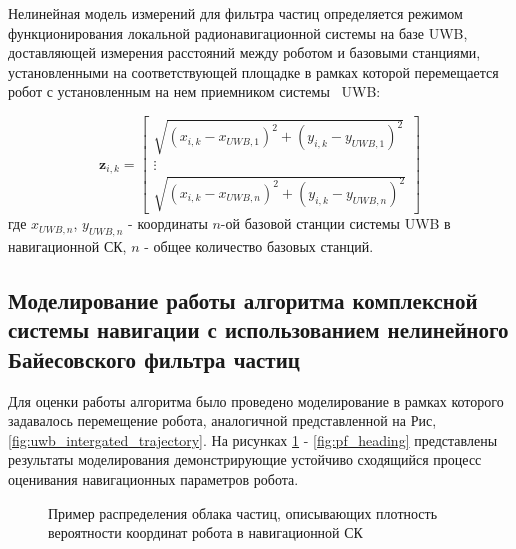 \documentclass[14pt]{article}
\begin{document}
Нелинейная модель измерений для фильтра частиц определяется режимом функционирования локальной радионавигационной системы на базе UWB, доставляющей измерения расстояний между роботом и  базовыми станциями, установленными на соответствующей площадке в рамках которой перемещается робот с установленным на нем приемником системы  UWB:

\begin{equation}
 \mathbf z_{i, k} = \begin{bmatrix} \sqrt{\left(x_{i, k} - x_{UWB, 1}\right)^2 + \left(y_{i, k} - y_{UWB, 1}\right)^2} \\ \vdots \\    \sqrt{\left(x_{i, k} - x_{UWB, n}\right)^2 + \left(y_{i, k} - y_{UWB,  n}\right)^2}  \end{bmatrix} 
\end{equation}
где $x_{UWB, n}$, $y_{UWB, n}$ - координаты $n$-ой базовой станции системы UWB в навигационной СК, $n$ - общее количество базовых станций. 

\subsection{Моделирование работы алгоритма комплексной системы навигации с использованием нелинейного Байесовского фильтра частиц}
Для оценки работы алгоритма было проведено моделирование в рамках которого задавалось перемещение робота, аналогичной представленной на Рис, \ref{fig:uwb_intergated_trajectory}.  
На рисунках \ref{fig:pf_particles} - \ref{fig:pf_heading} представлены результаты моделирования демонстрирующие устойчиво сходящийся процесс оценивания навигационных параметров робота. 

\begin{figure}
\noindent{}
\caption{Пример распределения облака частиц, описывающих плотность вероятности координат робота в навигационной СК}
\label{fig:pf_particles}
\end{figure}
\end{document}
